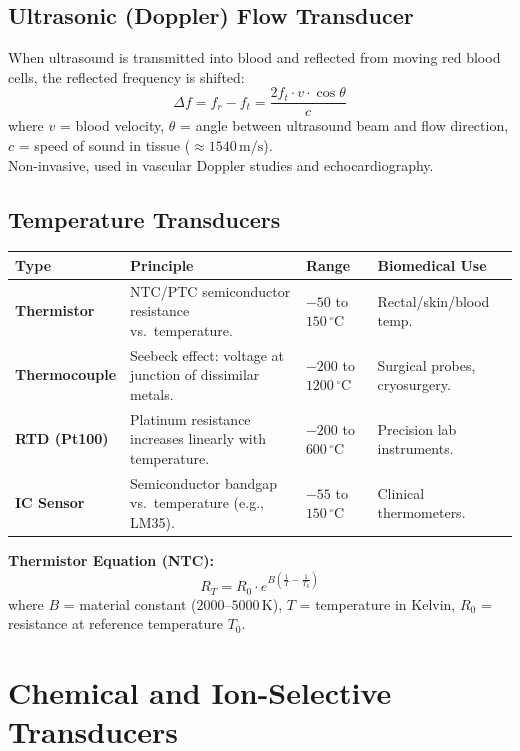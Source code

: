 \documentclass[12pt,a4paper]{article}
\begin{document}
\subsection{Ultrasonic (Doppler) Flow Transducer}

When ultrasound is transmitted into blood and reflected from moving red blood cells, the reflected frequency is shifted:
\[
\Delta f = f_r - f_t = \frac{2 f_t \cdot v \cdot \cos\theta}{c}
\]
where $v$ = blood velocity, $\theta$ = angle between ultrasound beam and flow direction, $c$ = speed of sound in tissue ($\approx 1540\,\text{m/s}$). \\[4pt]
Non-invasive, used in vascular Doppler studies and echocardiography.

\subsection{Temperature Transducers}

\par\noindent
\begin{tabularx}{\linewidth}{|B{2.8cm}|Y|>{\centering\arraybackslash}m{2.0cm}|Y|}
\hline
\textbf{Type} & \textbf{\color{myteal}Principle} & \textbf{\color{myamber}Range} & \textbf{\color{mygreen}Biomedical Use} \\
\hline
\textbf{Thermistor} & NTC/PTC semiconductor resistance vs.\ temperature. & $-50$ to $150\,^{\circ}$C & Rectal/skin/blood temp. \\
\hline
\textbf{Thermocouple} & Seebeck effect: voltage at junction of dissimilar metals. & $-200$ to $1200\,^{\circ}$C & Surgical probes, cryosurgery. \\
\hline
\textbf{RTD (Pt100)} & Platinum resistance increases linearly with temperature. & $-200$ to $600\,^{\circ}$C & Precision lab instruments. \\
\hline
\textbf{IC Sensor} & Semiconductor bandgap vs.\ temperature (e.g., LM35). & $-55$ to $150\,^{\circ}$C & Clinical thermometers. \\
\hline
\end{tabularx}

\textbf{Thermistor Equation (NTC):}
\[
R_T = R_0 \cdot e^{B\left(\frac{1}{T} - \frac{1}{T_0}\right)}
\]
where $B$ = material constant ($2000$--$5000\,\text{K}$), $T$ = temperature in Kelvin, $R_0$ = resistance at reference temperature $T_0$.

\section{Chemical and Ion-Selective Transducers}
\end{document}

